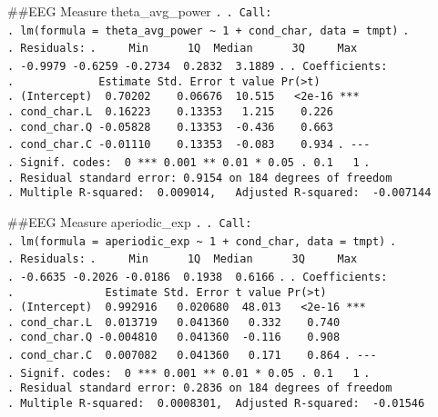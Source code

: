 \documentclass[
]{article}
\begin{document}
\#\#EEG Measure theta\_avg\_power \texttt{.} \texttt{.\ Call:}
\texttt{.\ lm(formula\ =\ theta\_avg\_power\ \textasciitilde{}\ 1\ +\ cond\_char,\ data\ =\ tmpt)}
\texttt{.} \texttt{.\ Residuals:}
\texttt{.\ \ \ \ \ Min\ \ \ \ \ \ 1Q\ \ Median\ \ \ \ \ \ 3Q\ \ \ \ \ Max}
\texttt{.\ -0.9979\ -0.6259\ -0.2734\ \ 0.2832\ \ 3.1889} \texttt{.}
\texttt{.\ Coefficients:}
\texttt{.\ \ \ \ \ \ \ \ \ \ \ \ \ Estimate\ Std.\ Error\ t\ value\ Pr(\textgreater{}\textbar{}t\textbar{})}
\texttt{.\ (Intercept)\ \ 0.70202\ \ \ \ 0.06676\ \ 10.515\ \ \ \textless{}2e-16\ ***}
\texttt{.\ cond\_char.L\ \ 0.16223\ \ \ \ 0.13353\ \ \ 1.215\ \ \ \ 0.226}
\texttt{.\ cond\_char.Q\ -0.05828\ \ \ \ 0.13353\ \ -0.436\ \ \ \ 0.663}
\texttt{.\ cond\_char.C\ -0.01110\ \ \ \ 0.13353\ \ -0.083\ \ \ \ 0.934}
\texttt{.\ -\/-\/-}
\texttt{.\ Signif.\ codes:\ \ 0\ \textquotesingle{}***\textquotesingle{}\ 0.001\ \textquotesingle{}**\textquotesingle{}\ 0.01\ \textquotesingle{}*\textquotesingle{}\ 0.05\ \textquotesingle{}.\textquotesingle{}\ 0.1\ \textquotesingle{}\ \textquotesingle{}\ 1}
\texttt{.}
\texttt{.\ Residual\ standard\ error:\ 0.9154\ on\ 184\ degrees\ of\ freedom}
\texttt{.\ Multiple\ R-squared:\ \ 0.009014,\ \ \ Adjusted\ R-squared:\ \ -0.007144}

\#\#EEG Measure aperiodic\_exp \texttt{.} \texttt{.\ Call:}
\texttt{.\ lm(formula\ =\ aperiodic\_exp\ \textasciitilde{}\ 1\ +\ cond\_char,\ data\ =\ tmpt)}
\texttt{.} \texttt{.\ Residuals:}
\texttt{.\ \ \ \ \ Min\ \ \ \ \ \ 1Q\ \ Median\ \ \ \ \ \ 3Q\ \ \ \ \ Max}
\texttt{.\ -0.6635\ -0.2026\ -0.0186\ \ 0.1938\ \ 0.6166} \texttt{.}
\texttt{.\ Coefficients:}
\texttt{.\ \ \ \ \ \ \ \ \ \ \ \ \ \ Estimate\ Std.\ Error\ t\ value\ Pr(\textgreater{}\textbar{}t\textbar{})}
\texttt{.\ (Intercept)\ \ 0.992916\ \ \ 0.020680\ \ 48.013\ \ \ \textless{}2e-16\ ***}
\texttt{.\ cond\_char.L\ \ 0.013719\ \ \ 0.041360\ \ \ 0.332\ \ \ \ 0.740}
\texttt{.\ cond\_char.Q\ -0.004810\ \ \ 0.041360\ \ -0.116\ \ \ \ 0.908}
\texttt{.\ cond\_char.C\ \ 0.007082\ \ \ 0.041360\ \ \ 0.171\ \ \ \ 0.864}
\texttt{.\ -\/-\/-}
\texttt{.\ Signif.\ codes:\ \ 0\ \textquotesingle{}***\textquotesingle{}\ 0.001\ \textquotesingle{}**\textquotesingle{}\ 0.01\ \textquotesingle{}*\textquotesingle{}\ 0.05\ \textquotesingle{}.\textquotesingle{}\ 0.1\ \textquotesingle{}\ \textquotesingle{}\ 1}
\texttt{.}
\texttt{.\ Residual\ standard\ error:\ 0.2836\ on\ 184\ degrees\ of\ freedom}
\texttt{.\ Multiple\ R-squared:\ \ 0.0008301,\ \ Adjusted\ R-squared:\ \ -0.01546}
\end{document}
